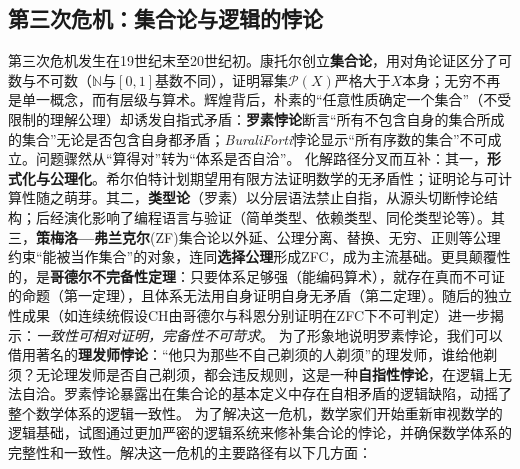 \subsection{第三次危机：集合论与逻辑的悖论}



第三次危机发生在19世纪末至20世纪初。康托尔创立{\bf 集合论}，用对角论证区分了可数与不可数（$\mathbb{N}$与$[0,1]$基数不同），证明幂集$\mathcal{P}(X)$严格大于$X$本身；无穷不再是单一概念，而有层级与算术。辉煌背后，朴素的“任意性质确定一个集合”（不受限制的理解公理）却诱发自指式矛盾：{\bf 罗素悖论}断言“所有不包含自身的集合所成的集合”无论是否包含自身都矛盾；{\itshape Burali\textendash Forti}悖论显示“所有序数的集合”不可成立。问题骤然从“算得对”转为“体系是否自洽”。
化解路径分叉而互补：其一，{\bf 形式化与公理化}。希尔伯特计划期望用有限方法证明数学的无矛盾性；证明论与可计算性随之萌芽。其二，{\bf 类型论}（罗素）以分层语法禁止自指，从源头切断悖论结构；后经演化影响了编程语言与验证（简单类型、依赖类型、同伦类型论等）。其三，{\bf 策梅洛—弗兰克尔}(ZF)集合论以外延、公理分离、替换、无穷、正则等公理约束“能被当作集合”的对象，连同{\bf 选择公理}形成ZFC，成为主流基础。更具颠覆性的，是{\bf 哥德尔不完备性定理}：只要体系足够强（能编码算术），就存在真而不可证的命题（第一定理），且体系无法用自身证明自身无矛盾（第二定理）。随后的独立性成果（如连续统假设CH由哥德尔与科恩分别证明在ZFC下不可判定）进一步揭示：{\itshape 一致性可相对证明，完备性不可苛求}。
为了形象地说明罗素悖论，我们可以借用著名的{\bf 理发师悖论}：“他只为那些不自己剃须的人剃须”的理发师，谁给他剃须？无论理发师是否自己剃须，都会违反规则，这是一种{\bf 自指性悖论}，在逻辑上无法自洽。罗素悖论暴露出在集合论的基本定义中存在自相矛盾的逻辑缺陷，动摇了整个数学体系的逻辑一致性。
为了解决这一危机，数学家们开始重新审视数学的逻辑基础，试图通过更加严密的逻辑系统来修补集合论的悖论，并确保数学体系的完整性和一致性。解决这一危机的主要路径有以下几方面：


